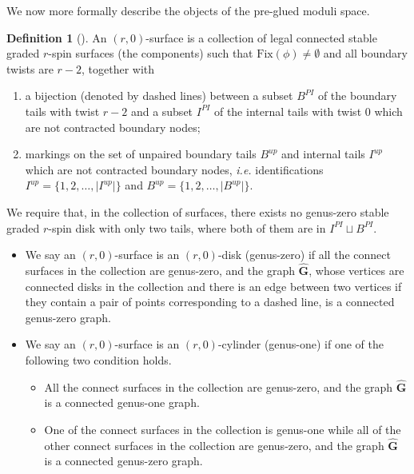 \documentclass[11pt]{amsart}
\theoremstyle{definition}
\newtheorem{dfn}[dummy]{Definition}
\theoremstyle{remark}
\newcommand{\<}{\left<}
\renewcommand{\>}{\right>}
\numberwithin{equation}{section}
\begin{document}
We now more formally describe the objects of the pre-glued moduli space.
\begin{dfn}[{\cite[Definition 4.3]{TZ1}}]\label{dfn rh disk}
    An $(r,0)$-surface is a collection of legal connected  stable graded $r$-spin surfaces (the components) such that $\text{Fix}(\phi)\ne \emptyset$ and all boundary twists are $r-2$, together with
    \begin{enumerate}
        \item a bijection (denoted by dashed lines) between a subset $B^{PI}$ of the boundary tails with twist $r-2$ and a subset $I^{PI}$ of the internal tails with twist $0$ which are not contracted boundary nodes;
        \item markings on the set of unpaired boundary tails $B^{up}$ and internal tails $I^{up}$ which are not contracted boundary nodes, \textit{i.e.} identifications $I^{up}=\{1,2,\dots,\lvert I^{up}\rvert\}$ and $B^{up}=\{1,2,\dots,\lvert B^{up}\rvert\}$.
    \end{enumerate}
    We require that, in the collection of surfaces, there exists no genus-zero stable graded $r$-spin disk with only two tails, where both of them are in $I^{PI}\sqcup B^{PI}$.
    \begin{itemize}
        \item  We say an $(r,0)$-surface is an $(r,0)$-disk (genus-zero) if all the connect surfaces in the collection are genus-zero, and the graph $\hat{\mathbf{G}}$, whose vertices are connected disks in the collection and there is an edge between two vertices if they contain a pair of points corresponding to a dashed line, is a connected genus-zero graph.
        \item  We say an $(r,0)$-surface is an $(r,0)$-cylinder (genus-one) if one of the following two condition holds. 
        \begin{itemize}
            \item All the connect surfaces in the collection are genus-zero, and the graph $\hat{\mathbf{G}}$ is a connected genus-one graph.
            \item One of the connect surfaces in the collection is genus-one while all of the other connect surfaces in the collection are genus-zero, and the graph $\hat{\mathbf{G}}$ is a connected genus-zero graph.
        \end{itemize}
    \end{itemize}
   
    
\end{dfn}
\end{document}
